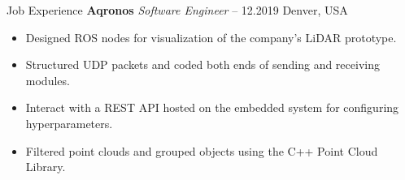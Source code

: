 \begin{rubric}{Job Experience}
%
%
\entry*[] \textbf{Aqronos} \hfill \textit{Software Engineer}  -- 12.2019 \hfill Denver, USA \newline
\vspace{\CVItemizeHeaderSpacing} \begin{itemize} %
	\setlength{\itemsep}{\CVItemizeSpacing}
	\item Designed ROS nodes for visualization of the company's LiDAR prototype.  
	\item Structured UDP packets and coded both ends of sending and receiving modules.
	\item Interact with a REST API hosted on the embedded system for configuring hyperparameters.
	\item Filtered point clouds and grouped objects using the C++ Point Cloud Library.  
\end{itemize}

\begin{comment}

%
%
\entry*[] \textbf{Creative Edge LLC} \hfill \textit{Software Engineer} \newline
08.2017 -- 09.2018 \hfill Denver, USA \newline
\vspace{\CVItemizeHeaderSpacing} \begin{itemize} %
	\setlength{\itemsep}{\CVItemizeSpacing}
	\item Developed applications for cryptocurrency mining in both Windows and Linux.  
	\item Wrote software managing OS drivers, system configurations, and 3rd party tools.
\end{itemize}

\end{comment}

\end{rubric}
